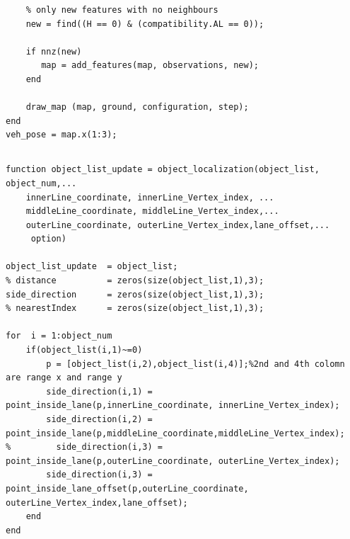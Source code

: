 \documentclass[12pt,a4paper]{article}
\newcommand{\zhiv}{\fontsize{12pt}{18pt}\selectfont}      %
\begin{document}
{{{\begin{verbatim}
    % only new features with no neighbours
    new = find((H == 0) & (compatibility.AL == 0));
    
    if nnz(new)
       map = add_features(map, observations, new);
    end

    draw_map (map, ground, configuration, step); 
end
veh_pose = map.x(1:3);

\end{verbatim}


{\subsection{\textbf{\song\zhiv{目标定位模块 m函数}}}}

\begin{verbatim}
function object_list_update = object_localization(object_list, object_num,...
    innerLine_coordinate, innerLine_Vertex_index, ...
    middleLine_coordinate, middleLine_Vertex_index,...
    outerLine_coordinate, outerLine_Vertex_index,lane_offset,...
     option)

object_list_update  = object_list;
% distance          = zeros(size(object_list,1),3);
side_direction      = zeros(size(object_list,1),3);
% nearestIndex      = zeros(size(object_list,1),3);

for  i = 1:object_num
    if(object_list(i,1)~=0)
        p = [object_list(i,2),object_list(i,4)];%2nd and 4th colomn are range x and range y
        side_direction(i,1) = point_inside_lane(p,innerLine_coordinate, innerLine_Vertex_index);
        side_direction(i,2) = point_inside_lane(p,middleLine_coordinate,middleLine_Vertex_index);
%         side_direction(i,3) = point_inside_lane(p,outerLine_coordinate, outerLine_Vertex_index);
        side_direction(i,3) = point_inside_lane_offset(p,outerLine_coordinate, outerLine_Vertex_index,lane_offset);       
    end
end


\end{verbatim}}}}
\end{document}
